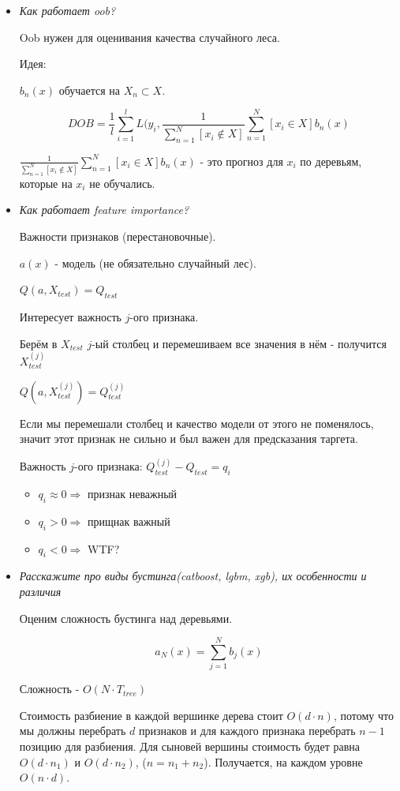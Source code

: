 \documentclass[12pt]{article}
\begin{document}
\begin{itemize}
\item \textit{Как работает oob?}

Oob нужен для оценивания качества случайного леса.

Идея:

$b_n(x)$ обучается на $X_n \subset X$.

\[ DOB = \frac{1}{l} \sum_{i=1}^l L(y_i, \frac{1}{\sum_{n=1}^N [x_i \not\in X]} \sum_{n=1}^N [x_i \in X] b_n(x) \]

$\frac{1}{\sum_{n=1}^N [x_i \not\in X]} \sum_{n=1}^N [x_i \in X] b_n(x)$ - это прогноз для $x_i$ по деревьям, которые на $x_i$ не обучались.

\item \textit{Как работает feature importance?}

Важности признаков (перестановочные).

$a(x)$ - модель (не обязательно случайный лес).

$Q(a, X_{test}) = Q_{test}$

Интересует важность $j$-ого признака.

Берём в $X_{test}$ $j$-ый столбец и перемешиваем все значения в нём - получится $X_{test}^{(j)}$

$Q(a, X_{test}^{(j)}) = Q_{test}^{(j)}$

Если мы перемешали столбец и качество модели от этого не поменялось, значит этот признак не сильно и был важен для предсказания таргета.

Важность $j$-ого признака: $Q_{test}^{(j)} - Q_{test} = q_i$

\begin{itemize}

\item $q_i \approx 0 \Rightarrow$ признак неважный

\item $q_i > 0 \Rightarrow$ прищнак важный

\item $q_i < 0 \Rightarrow $ WTF?
\end{itemize}

\item \textit{Расскажите про виды бустинга(catboost, lgbm, xgb), их особенности и различия}

Оценим сложность бустинга над деревьями.

\[ a_N(x) = \sum_{j=1}^N b_j(x)\]

Сложность - $O(N \cdot T_{tree})$

Стоимость разбиение в каждой вершинке дерева стоит $O(d \cdot n)$, потому что мы должны перебрать $d$ признаков и для каждого признака перебрать $n-1$ позицию для разбиения. Для сыновей вершины стоимость будет равна $O(d \cdot n_1)$ и $O(d \cdot n_2)$, ($n = n_1 + n_2$).
Получается, на каждом уровне $O(n \cdot d)$.


\end{itemize}
\end{document}
